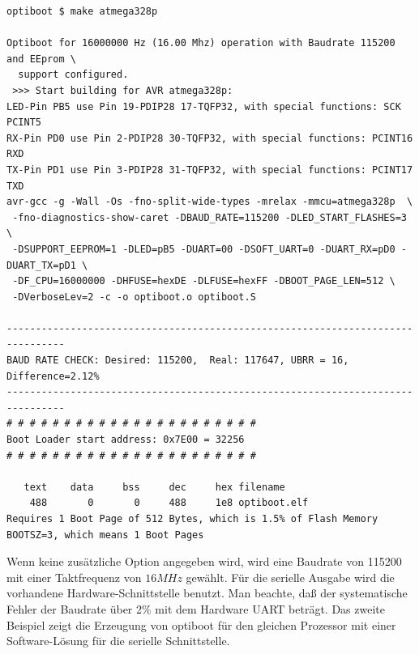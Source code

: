 \begin{verbatim}
optiboot $ make atmega328p

Optiboot for 16000000 Hz (16.00 Mhz) operation with Baudrate 115200 and EEprom \
  support configured.
 >>> Start building for AVR atmega328p:
LED-Pin PB5 use Pin 19-PDIP28 17-TQFP32, with special functions: SCK PCINT5
RX-Pin PD0 use Pin 2-PDIP28 30-TQFP32, with special functions: PCINT16 RXD
TX-Pin PD1 use Pin 3-PDIP28 31-TQFP32, with special functions: PCINT17 TXD
avr-gcc -g -Wall -Os -fno-split-wide-types -mrelax -mmcu=atmega328p  \
 -fno-diagnostics-show-caret -DBAUD_RATE=115200 -DLED_START_FLASHES=3 \
 -DSUPPORT_EEPROM=1 -DLED=pB5 -DUART=00 -DSOFT_UART=0 -DUART_RX=pD0 -DUART_TX=pD1 \
 -DF_CPU=16000000 -DHFUSE=hexDE -DLFUSE=hexFF -DBOOT_PAGE_LEN=512 \
 -DVerboseLev=2 -c -o optiboot.o optiboot.S

--------------------------------------------------------------------------------
BAUD RATE CHECK: Desired: 115200,  Real: 117647, UBRR = 16, Difference=2.12%
--------------------------------------------------------------------------------
# # # # # # # # # # # # # # # # # # # # # #
Boot Loader start address: 0x7E00 = 32256
# # # # # # # # # # # # # # # # # # # # # #

   text	   data	    bss	    dec	    hex	filename
    488	      0	      0	    488	    1e8	optiboot.elf
Requires 1 Boot Page of 512 Bytes, which is 1.5% of Flash Memory
BOOTSZ=3, which means 1 Boot Pages

\end{verbatim}

Wenn keine zusätzliche Option angegeben wird, wird eine Baudrate von 115200 mit einer Taktfrequenz von \(16 MHz\) gewählt.
Für die serielle Ausgabe wird die vorhandene Hardware-Schnittstelle benutzt. 
Man beachte, daß der systematische Fehler der Baudrate über 2\% mit dem Hardware UART beträgt.
Das zweite Beispiel zeigt die Erzeugung von optiboot für den gleichen Prozessor mit einer Software-Lösung
für die serielle Schnittstelle.

